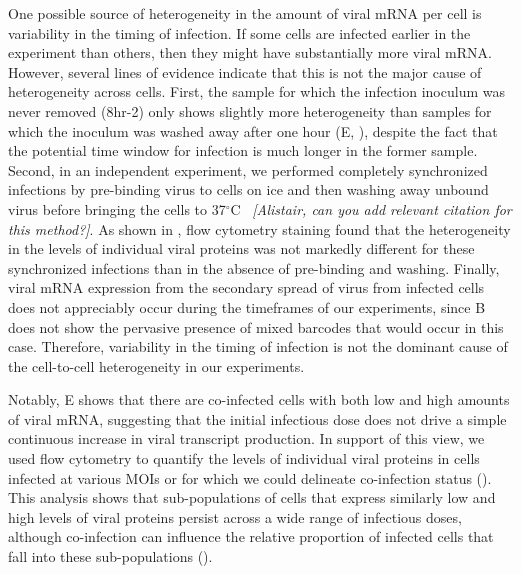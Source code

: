 \documentclass[9pt,lineno]{elife}
\newcommand{\jdbcomment}[1]{\emph{\color{red} [#1]}}
\begin{document}
One possible source of heterogeneity in the amount of viral mRNA per cell is variability in the timing of infection.
If some cells are infected earlier in the experiment than others, then they might have substantially more viral mRNA.
However, several lines of evidence indicate that this is not the major cause of heterogeneity across cells.
First, the sample for which the infection inoculum was never removed (8hr-2) only shows slightly more heterogeneity than samples for which the inoculum was washed away after one hour (E, ), despite the fact that the potential time window for infection is much longer in the former sample.
Second, in an independent experiment, we performed completely synchronized infections by pre-binding virus to cells on ice and then washing away unbound virus before bringing the cells to 37$^{\circ}$C~\jdbcomment{Alistair, can you add relevant citation for this method?}.
As shown in , flow cytometry staining found that the heterogeneity in the levels of individual viral proteins was not markedly different for these synchronized infections than in the absence of pre-binding and washing.
Finally, viral mRNA expression from the secondary spread of virus from infected cells does not appreciably occur during the timeframes of our experiments, since B does not show the pervasive presence of mixed barcodes that would occur in this case.
Therefore, variability in the timing of infection is not the dominant cause of the cell-to-cell heterogeneity in our experiments.

Notably, E shows that there are co-infected cells with both low and high amounts of viral mRNA, suggesting that the initial infectious dose does not drive a simple continuous increase in viral transcript production.
In support of this view, we used flow cytometry to quantify the levels of individual viral proteins in cells infected at various MOIs or for which we could delineate co-infection status ().
This analysis shows that sub-populations of cells that express similarly low and high levels of viral proteins persist across a wide range of infectious doses, although co-infection can influence the relative proportion of infected cells that fall into these sub-populations ().
\end{document}
